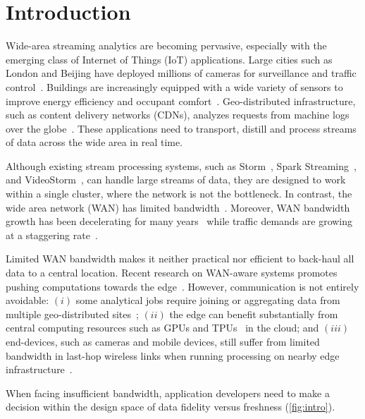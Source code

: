 \section{Introduction}

Wide-area streaming analytics are becoming pervasive, especially with the
emerging class of Internet of Things (IoT) applications.  Large cities such as
London and Beijing have deployed millions of cameras for surveillance and
traffic control~\cite{skynet, london.surveillance}. Buildings are increasingly
equipped with a wide variety of sensors to improve energy efficiency and
occupant comfort~\cite{krioukov2012building}. Geo-distributed infrastructure,
such as content delivery networks (CDNs), analyzes requests from machine logs
over the globe~\cite{mukerjee2015practical}. These applications need to
transport, distill and process streams of data across the wide area in real
time.

Although existing stream processing systems, such as
Storm~\cite{toshniwal2014storm}, Spark Streaming~\cite{zaharia2013discretized},
and VideoStorm~\cite{zhang2017live}, can handle large streams of data, they are
designed to work within a single cluster, where the network is not the
bottleneck.  In contrast, the wide area network (WAN) has limited
bandwidth~\cite{hsieh17gaia, vulimiri2015global}. Moreover, WAN bandwidth growth
has been decelerating for many years~\cite{global2016telegeography} while
traffic demands are growing at a staggering rate~\cite{index2013zettabyte}.

Limited WAN bandwidth makes it neither practical nor efficient to back-haul all
data to a central location.  Recent research on WAN-aware systems promotes
pushing computations towards the edge~\cite{rabkin2014aggregation,
  satyanarayanan2009case}. However, communication is not entirely avoidable:
$(i)$ some analytical jobs require joining or aggregating data from multiple
geo-distributed sites~\cite{pu2015low, viswanathan2016clarinet}; $(ii)$ the edge
can benefit substantially from central computing resources such as GPUs and
TPUs~\cite{abadi2016tensorflow} in the cloud; and $(iii)$ end-devices, such as
cameras and mobile devices, still suffer from limited bandwidth in last-hop
wireless links when running processing on nearby edge
infrastructure~\cite{abari2017enabling, zhang2015design}.

When facing insufficient bandwidth, application developers need to make a
decision within the design space of data fidelity versus freshness
(\autoref{fig:intro}).

